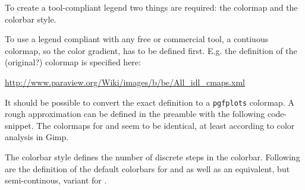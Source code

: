 
To create a tool-compliant legend two things are required: the colormap and the colorbar style.


To use a legend compliant with any free or commercial tool, a contiuous colormap, so the color gradient, has to be defined first. E.g. the definition of the (original?) \marktool{\paraviewname} colormap is specified here:

\href{http://www.paraview.org/Wiki/images/b/be/All_idl_cmaps.xml}{http://www.paraview.org/Wiki/images/b/be/All\_idl\_cmaps.xml}

It should be possible to convert the exact definition to a \verb+pgfplots+ colormap. A rough approximation can be defined in the preamble with the following code-snippet. The colormaps for \marktool{\paraviewname} and \marktool{\abaqusname} seem to be identical, at least according to color analysis in Gimp.

\begin{code}

\end{code}


The colorbar style defines the number of discrete steps in the colorbar. Following are the definition of the default colorbars for \marktool{\abaqusname} and  as well as an equivalent, but semi-continous, variant for \marktool{\paraviewname}.

